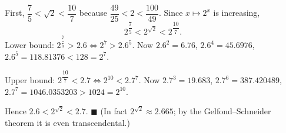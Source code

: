 First, \(\dfrac{7}{5}<\sqrt2<\dfrac{10}{7}\) because \(\dfrac{49}{25}<2<\dfrac{100}{49}\). Since \(x\mapsto 2^x\) is increasing,
\[
2^{\dfrac{7}{5}}<2^{\sqrt2}<2^{\dfrac{10}{7}}.
\]
Lower bound: \(2^{\dfrac{7}{5}}>2.6\iff 2^7>2.6^5\). Now \(2.6^2=6.76\), \(2.6^4=45.6976\), \(2.6^5=118.81376<128=2^7\).

Upper bound: \(2^{\dfrac{10}{7}}<2.7\iff 2^{10}<2.7^7\). Now \(2.7^3=19.683\), \(2.7^6=387.420489\), \(2.7^7=1046.0353203>1024=2^{10}\).

Hence \(2.6<2^{\sqrt2}<2.7\). \(\blacksquare\) (In fact \(2^{\sqrt2}\approx 2.665\); by the Gelfond--Schneider theorem it is even transcendental.)

